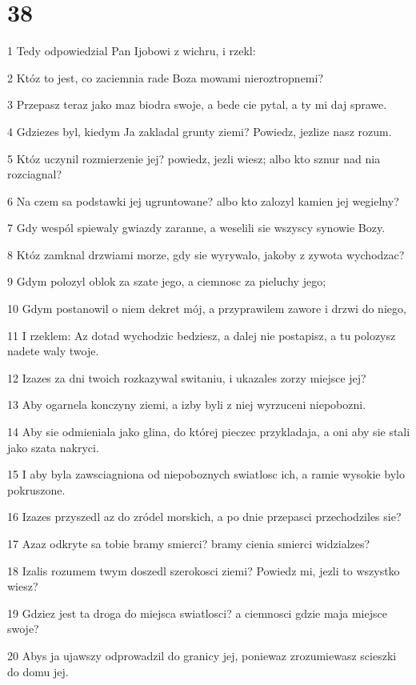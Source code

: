 \chapter{38}

\par 1 Tedy odpowiedzial Pan Ijobowi z wichru, i rzekl:
\par 2 Któz to jest, co zaciemnia rade Boza mowami nieroztropnemi?
\par 3 Przepasz teraz jako maz biodra swoje, a bede cie pytal, a ty mi daj sprawe.
\par 4 Gdziezes byl, kiedym Ja zakladal grunty ziemi? Powiedz, jezlize nasz rozum.
\par 5 Któz uczynil rozmierzenie jej? powiedz, jezli wiesz; albo kto sznur nad nia rozciagnal?
\par 6 Na czem sa podstawki jej ugruntowane? albo kto zalozyl kamien jej wegielny?
\par 7 Gdy wespól spiewaly gwiazdy zaranne, a weselili sie wszyscy synowie Bozy.
\par 8 Któz zamknal drzwiami morze, gdy sie wyrywalo, jakoby z zywota wychodzac?
\par 9 Gdym polozyl oblok za szate jego, a ciemnosc za pieluchy jego;
\par 10 Gdym postanowil o niem dekret mój, a przyprawilem zawore i drzwi do niego,
\par 11 I rzeklem: Az dotad wychodzic bedziesz, a dalej nie postapisz, a tu polozysz nadete waly twoje.
\par 12 Izazes za dni twoich rozkazywal switaniu, i ukazales zorzy miejsce jej?
\par 13 Aby ogarnela konczyny ziemi, a izby byli z niej wyrzuceni niepobozni.
\par 14 Aby sie odmieniala jako glina, do której pieczec przykladaja, a oni aby sie stali jako szata nakryci.
\par 15 I aby byla zawsciagniona od niepoboznych swiatlosc ich, a ramie wysokie bylo pokruszone.
\par 16 Izazes przyszedl az do zródel morskich, a po dnie przepasci przechodziles sie?
\par 17 Azaz odkryte sa tobie bramy smierci? bramy cienia smierci widzialzes?
\par 18 Izalis rozumem twym doszedl szerokosci ziemi? Powiedz mi, jezli to wszystko wiesz?
\par 19 Gdziez jest ta droga do miejsca swiatlosci? a ciemnosci gdzie maja miejsce swoje?
\par 20 Abys ja ujawszy odprowadzil do granicy jej, poniewaz zrozumiewasz scieszki do domu jej.
